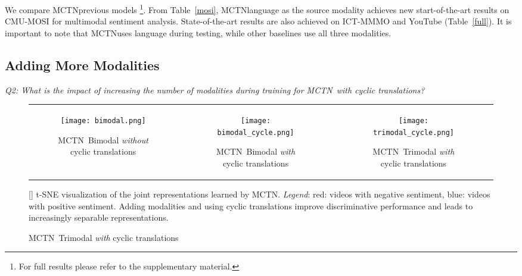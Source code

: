 \documentclass[letterpaper]{article} %
\newcommand{\ours}{MCTN}
\begin{document}
We compare \ours \with  previous models \footnote{For full results please refer to the supplementary material.}. From Table~\ref{mosi}, \ours \using language as the source modality achieves new start-of-the-art results on CMU-MOSI for multimodal sentiment analysis. State-of-the-art results are also achieved on ICT-MMMO and YouTube (Table~\ref{full}). It is important to note that \ours \only uses language during testing, while other baselines use all three modalities.

\subsection{Adding More Modalities}

\textit{Q2: What is the impact of increasing the number of modalities during training for \ours \ with cyclic translations?}

\begin{figure}[!tb]
\centering
\setlength\tabcolsep{1.0pt}
\begin{tabular}{ccc}
\begin{subfigure}{0.33\linewidth}\centering\texttt{[image: bimodal.png]}\caption{
\centering
\footnotesize{
\centering
\ours \ Bimodal \textit{without} cyclic translations}
}\label{fig:taba}\end{subfigure} &
\begin{subfigure}{0.33\linewidth}\centering\texttt{[image: bimodal\_cycle.png]}\caption{
\centering
\footnotesize{\ours \ Bimodal \textit{with} cyclic translations}
}\label{fig:tabb}\end{subfigure} &
\begin{subfigure}{0.33\linewidth}\centering\texttt{[image: trimodal\_cycle.png]}\caption{
\centering
\footnotesize{\ours \ Trimodal \textit{with} cyclic translations}
}\label{fig:tabc}\end{subfigure}\\
\end{tabular}
[]{
\small
{t-SNE visualization of the joint representations learned by \ours. \textit{Legend}: red: videos with negative sentiment, blue: videos with positive sentiment. Adding modalities and using cyclic translations improve discriminative performance and leads to increasingly separable representations.}
}
\label{fig:tsne}
\end{figure}
\end{document}
